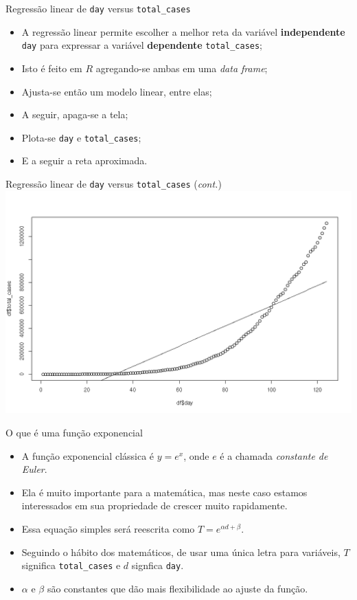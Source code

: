 \documentclass[a4paper,10pt]{beamer}
\begin{document}
\begin{frame}{ Regressão linear de {\tt day} versus  {\tt total\_cases}}
  
  
  \begin{itemize}
      \item A regressão linear permite escolher a melhor reta da variável 
	  {\bf independente} {\tt day} para expressar a variável 
	  {\bf dependente} {\tt total\_cases};
      \item Isto é feito em $R$ agregando-se ambas em uma {\em data frame};
      \item Ajusta-se então um modelo linear, entre elas;
      \item A seguir, apaga-se a tela;
      \item Plota-se {\tt day} e {\tt total\_cases};
      \item E a seguir a reta aproximada.
  \end{itemize}

\end{frame}

\begin{frame}{ Regressão linear de {\tt day} versus  {\tt total\_cases}
    ({\em cont.}) }
  \includegraphics[scale=0.375]{plot-lin.png}
  
\end{frame}

\begin{frame}{O que é uma função exponencial}
  \begin{itemize}
      \item A função exponencial clássica é $y = e^x$, onde $e$ é a chamada
	  {\em constante de Euler}.
      \item Ela é muito importante para a matemática, mas neste caso estamos
	  interessados em sua propriedade de crescer muito rapidamente.
      \item Essa equação simples será reescrita como 
	  $T = e^{\alpha d + \beta}$.
      \item Seguindo o hábito dos matemáticos, de usar uma única letra para 
	  variáveis, $T$ significa {\tt total\_cases} e $d$ signfica
	  {\tt day}.
      \item $\alpha$ e $\beta$ são constantes que dão mais flexibilidade 
	  ao ajuste da função.
  \end{itemize}

\end{frame}
\end{document}
